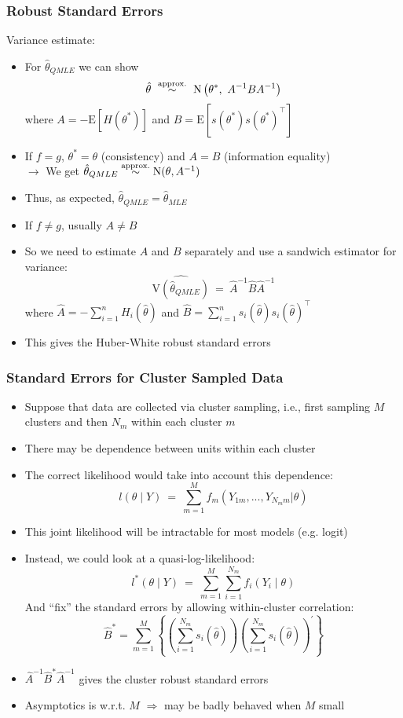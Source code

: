 \documentclass{beamer}
\begin{document}
\begin{frame}
\frametitle{Robust Standard Errors}
Variance estimate:
\begin{itemize}[<+->]
\item For $\hat\theta_{QMLE}$ we can show
    $$\hat\theta \ \stackrel{{\rm approx.}}{\sim} \
        \text{N}\left(\theta^\ast, \ A^{-1}BA^{-1} \right) $$
where \quad $A = -\text{E}[H(\theta^\ast)]$ \quad and \quad $B = \text{E}[s(\theta^\ast)s(\theta^\ast)^\top]$
\bigskip
\item If $f = g$, $\theta^\ast = \theta$ (consistency) and $A = B$ (information equality) \\
    $\longrightarrow$ We get $\hat\theta_{QMLE} \stackrel{{\rm approx.}}{\sim}
    \text{N}(\theta, A^{-1})$
\item Thus, as expected, $\hat\theta_{QMLE} = \hat\theta_{MLE}$
\bigskip
\item If $f\neq g$, usually $A\neq B$
\item So we need to estimate $A$ and $B$ separately and use a
    \alert{sandwich estimator} for variance:
    $$ \widehat{\text{V}(\hat\theta_{QMLE})} \ = \ \hat{A}^{-1}\hat{B}\hat{A}^{-1}$$
    where \quad $\hat{A} = -\sum_{i=1}^n H_i(\hat\theta)$ \quad and \quad
    $\hat{B} = \sum_{i=1}^n s_i(\hat\theta)s_i(\hat\theta)^\top$
\item This gives the \alert{Huber-White robust standard errors}
\end{itemize}
\end{frame}

\begin{frame}
\frametitle{Standard Errors for Cluster Sampled Data}
\begin{itemize}[<+->]
  \item Suppose that data are collected via \alert{cluster sampling},
    i.e., first sampling $M$ clusters and then $N_m$ within each
    cluster $m$
  \item There may be dependence between units within each cluster
\medskip
  \item The correct likelihood would take into account this
    dependence:
$$ \textstyle l(\theta\mid Y) \ = \ \sum_{m=1}^M f_m(Y_{1m}, ..., Y_{N_m m}| \theta) $$
  \item This joint likelihood will be intractable for most models
    (e.g. logit)
  \item Instead, we could look at a quasi-log-likelihood:
$$ \textstyle l^\ast(\theta\mid Y) \ = \ \sum_{m=1}^M \sum_{i=1}^{N_m}
f_i(Y_i\mid \theta) $$
  And ``fix'' the standard errors by allowing within-cluster correlation:
  $$ \hat{B}^\ast = \sum_{m=1}^M \left\{ \left(\sum_{i=1}^{N_m} s_i(\hat\theta)\right)
  \left(\sum_{i=1}^{N_m} s_i(\hat\theta)\right)^{'}\right\} $$
  \item $\hat{A}^{-1}\hat{B}^\ast\hat{A}^{-1}$ gives the
    \alert{cluster robust standard errors}
  \item Asymptotics is w.r.t. $M$ $\Rightarrow$ may be badly behaved
    when $M$ small

\end{itemize}
\end{frame}
\end{document}
